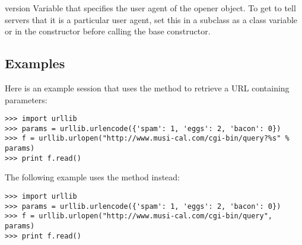 \begin{memberdesc}[URLopener]{version}
Variable that specifies the user agent of the opener object.  To get
 to tell servers that it is a particular user agent,
set this in a subclass as a class variable or in the constructor
before calling the base constructor.
\end{memberdesc}


\subsection{Examples}

Here is an example session that uses the  method to retrieve
a URL containing parameters:

\begin{verbatim}
>>> import urllib
>>> params = urllib.urlencode({'spam': 1, 'eggs': 2, 'bacon': 0})
>>> f = urllib.urlopen("http://www.musi-cal.com/cgi-bin/query?%s" % params)
>>> print f.read()
\end{verbatim}

The following example uses the  method instead:

\begin{verbatim}
>>> import urllib
>>> params = urllib.urlencode({'spam': 1, 'eggs': 2, 'bacon': 0})
>>> f = urllib.urlopen("http://www.musi-cal.com/cgi-bin/query", params)
>>> print f.read()
\end{verbatim}
